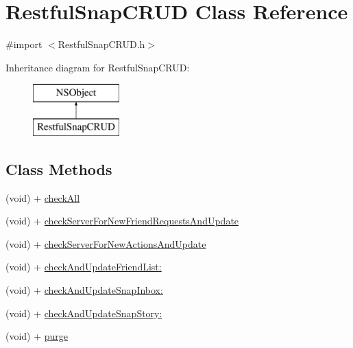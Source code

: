 \hypertarget{interface_restful_snap_c_r_u_d}{}\section{Restful\+Snap\+C\+R\+UD Class Reference}
\label{interface_restful_snap_c_r_u_d}


{\ttfamily \#import $<$Restful\+Snap\+C\+R\+U\+D.\+h$>$}

Inheritance diagram for Restful\+Snap\+C\+R\+UD\+:\begin{figure}[H]
\begin{center}
\leavevmode
\includegraphics[height=2.000000cm]{interface_restful_snap_c_r_u_d}
\end{center}
\end{figure}
\subsection*{Class Methods}
\begin{DoxyCompactItemize}
\item 
(void) + \hyperlink{interface_restful_snap_c_r_u_d_ab2b89bf5b824eaeca3d5294055e457ae}{check\+All}
\item 
(void) + \hyperlink{interface_restful_snap_c_r_u_d_abc7d760ea7967b8346f6c9167651df05}{check\+Server\+For\+New\+Friend\+Requests\+And\+Update}
\item 
(void) + \hyperlink{interface_restful_snap_c_r_u_d_a9a44ec05e413439e04303c74bc994eb4}{check\+Server\+For\+New\+Actions\+And\+Update}
\item 
(void) + \hyperlink{interface_restful_snap_c_r_u_d_a399872b75af010ba109388b4cbd565cf}{check\+And\+Update\+Friend\+List\+:}
\item 
(void) + \hyperlink{interface_restful_snap_c_r_u_d_a7f1e0da409e374d5584f352907c0a302}{check\+And\+Update\+Snap\+Inbox\+:}
\item 
(void) + \hyperlink{interface_restful_snap_c_r_u_d_a86db45997654bed0decf9ed73a270b86}{check\+And\+Update\+Snap\+Story\+:}
\item 
(void) + \hyperlink{interface_restful_snap_c_r_u_d_a30e86726956cc8aac83bb1e648b9702e}{purge}
\end{DoxyCompactItemize}


